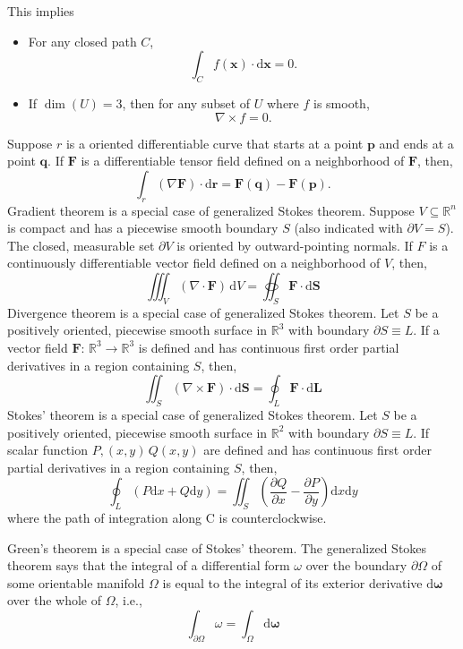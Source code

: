 \documentclass[a4paper,12pt]{report}
\begin{document}
\begin{itemize}
\begin{itemize}
This implies 
\begin{itemize}
\item For any closed path $C$, 
\[\int_Cf(\mathbf{x})\cdot\mathrm{d}\mathbf{x}=0.\]
\item If $\operatorname{dim}(U)=3$, then for any subset of $U$ where $f$ is smooth,
\[\nabla\times f=0.\]
\end{itemize}
Suppose $r$ is a oriented differentiable curve that starts at a point $\mathbf{p}$ and ends at a point $\mathbf{q}$. If $\mathbf{F}$ is a differentiable tensor field defined on a neighborhood of $\mathbf{F}$, then,
\[\int_r(\nabla\mathbf{F})\cdot\mathrm{d}\mathbf{r}=\mathbf{F}\left(\mathbf{q}\right)-\mathbf{F}\left(\mathbf{p}\right).\]
Gradient theorem is a special case of generalized Stokes theorem.
Suppose $V\subseteq\mathbb{R}^n$ is compact and has a piecewise smooth boundary $S$ (also indicated with $\partial V=S$). The closed, measurable set $\partial V$ is oriented by outward-pointing normals. If $F$ is a continuously differentiable vector field defined on a neighborhood of $V$, then,
\[\iiint_V\left(\nabla\cdot\mathbf {F}\right)\,\mathrm{d}V=\oiint_S\mathbf{F}\cdot\mathrm{d}\mathbf{S}\]
Divergence theorem is a special case of generalized Stokes theorem.
Let $S$ be a positively oriented, piecewise smooth surface in $\mathbb{R}^3$ with boundary $\partial S\equiv L$. If a vector field $\mathbf{F}:\,\mathbb{R}^3\rightarrow\mathbb{R}^3$ is defined and has continuous first order partial derivatives in a region containing $S$, then,
\[\iint_S(\nabla\times\mathbf{F})\cdot \mathrm{d}\mathbf{S}=\oint_{L}\mathbf{F}\cdot\mathrm{d}\mathbf{L}\]
Stokes' theorem is a special case of generalized Stokes theorem.
Let $S$ be a positively oriented, piecewise smooth surface in $\mathbb{R}^2$ with boundary $\partial S\equiv L$. If scalar function $P,(x,y)\,Q(x,y)$ are defined and has continuous first order partial derivatives in a region containing $S$, then,
\[\oint_L (P\mathrm{d}x+Q\mathrm{d}y)=\iint_S\left(\frac{\partial Q}{\partial x}-\frac{\partial P}{\partial y}\right)\mathrm{d}x\mathrm{d}y\]
where the path of integration along C is counterclockwise.

Green's theorem is a special case of Stokes' theorem.
The generalized Stokes theorem says that the integral of a differential form $\omega$ over the boundary $\partial\Omega$ of some orientable manifold $\Omega$ is equal to the integral of its exterior derivative $\mathrm{d}\boldsymbol{\omega}$ over the whole of $\Omega$, i.e.,
\[\int _{\partial\Omega}\omega=\int_{\Omega}\mathrm{d}\boldsymbol{\omega}\]




\end{itemize}
\end{itemize}
\end{document}
